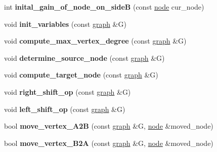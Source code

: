 \begin{DoxyCompactItemize}
int {\bfseries inital\+\_\+gain\+\_\+of\+\_\+node\+\_\+on\+\_\+sideB} (const \mbox{\hyperlink{classnode}{node}} cur\+\_\+node)
\item 
\mbox{\label{classratio__cut__partition_ab3054dcfbcd012aba57218fa6d0c471b}} 
void {\bfseries init\+\_\+variables} (const \mbox{\hyperlink{classgraph}{graph}} \&G)
\item 
\mbox{\label{classratio__cut__partition_af83d8fc26a0836f4852af5f1db1aff5b}} 
void {\bfseries compute\+\_\+max\+\_\+vertex\+\_\+degree} (const \mbox{\hyperlink{classgraph}{graph}} \&G)
\item 
\mbox{\label{classratio__cut__partition_a7d3397f85318f781fbae287037e0ae33}} 
void {\bfseries determine\+\_\+source\+\_\+node} (const \mbox{\hyperlink{classgraph}{graph}} \&G)
\item 
\mbox{\label{classratio__cut__partition_ae9a09532c706835e47ee4f02c24c82af}} 
void {\bfseries compute\+\_\+target\+\_\+node} (const \mbox{\hyperlink{classgraph}{graph}} \&G)
\item 
\mbox{\label{classratio__cut__partition_a9b2ac474cfdeabd8a2c5cb42fcc97d26}} 
void {\bfseries right\+\_\+shift\+\_\+op} (const \mbox{\hyperlink{classgraph}{graph}} \&G)
\item 
\mbox{\label{classratio__cut__partition_af736bd4e468935c1b1642f78d3df665d}} 
void {\bfseries left\+\_\+shift\+\_\+op} (const \mbox{\hyperlink{classgraph}{graph}} \&G)
\item 
\mbox{\label{classratio__cut__partition_a8988d72cd456e79243f0e1c1b03ed501}} 
bool {\bfseries move\+\_\+vertex\+\_\+\+A2B} (const \mbox{\hyperlink{classgraph}{graph}} \&G, \mbox{\hyperlink{classnode}{node}} \&moved\+\_\+node)
\item 
\mbox{\label{classratio__cut__partition_ab192d7130a80b6acf7da704162c51e6c}} 
bool {\bfseries move\+\_\+vertex\+\_\+\+B2A} (const \mbox{\hyperlink{classgraph}{graph}} \&G, \mbox{\hyperlink{classnode}{node}} \&moved\+\_\+node)
\item 

\end{DoxyCompactItemize}
